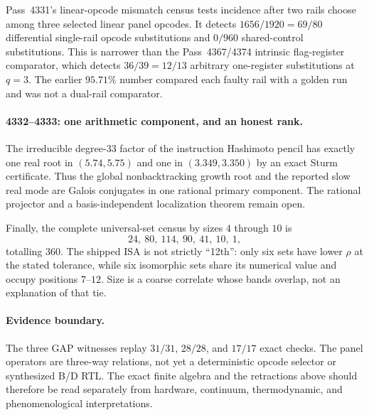Pass~4331's linear-opcode mismatch census tests incidence after two rails choose among
three selected linear panel opcodes.  It detects $1656/1920=69/80$ differential
single-rail opcode substitutions and $0/960$ shared-control substitutions.  This is
narrower than the Pass~4367/4374 intrinsic flag-register comparator, which detects
$36/39=12/13$ arbitrary one-register substitutions at $q=3$.  The earlier $95.71\%$
number compared each faulty rail with a golden run and was not a dual-rail comparator.

\paragraph{4332--4333: one arithmetic component, and an honest rank.}
The irreducible degree-$33$ factor of the instruction Hashimoto pencil has exactly one
real root in $(5.74,5.75)$ and one in $(3.349,3.350)$ by an exact Sturm certificate.
Thus the global nonbacktracking growth root and the reported slow real mode are Galois
conjugates in one rational primary component.  The rational projector and a
basis-independent localization theorem remain open.

Finally, the complete universal-set census by sizes $4$ through $10$ is
\[
 24,\ 80,\ 114,\ 90,\ 41,\ 10,\ 1,
\]
totalling $360$.  The shipped ISA is not strictly ``12th'': only six sets have lower
$\rho$ at the stated tolerance, while six isomorphic sets share its numerical value and
occupy positions $7$--$12$.  Size is a coarse correlate whose bands overlap, not an
explanation of that tie.

\paragraph{Evidence boundary.}
The three GAP witnesses replay $31/31$, $28/28$, and $17/17$ exact checks.  The panel operators are
three-way relations, not yet a deterministic opcode selector or synthesized B/D RTL.
The exact finite algebra and the retractions above should therefore be read separately
from hardware, continuum, thermodynamic, and phenomenological interpretations.
